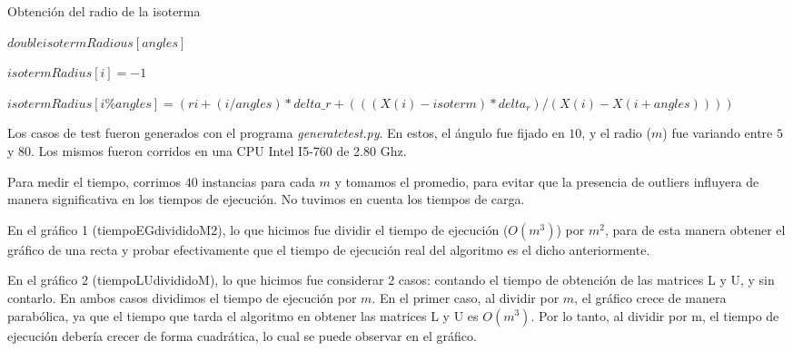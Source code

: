 \documentclass[a4paper]{article}
\begin{document}
\begin{algorithm}
\caption{Obtención del radio de la isoterma}\label{euclid}
\begin{algorithmic}[1]



    \State $double isotermRadious[angles]$

      \State $isotermRadius[i] = -1$
    \EndFor

       \State $isotermRadius[i \% angles] = (ri + (i / angles)*delta\_r + (((X(i) - isoterm) * delta_r)/ (X(i) - X(i+angles)) ))$
      \EndIf
    \EndFor

  \EndFunction

\end{algorithmic}
\end{algorithm}

\newpage




Los casos de test fueron generados con el programa \textit{generatetest.py}. En estos, el ángulo fue fijado en $10$, y el radio ($m$) fue variando entre $5$ y $80$. Los mismos fueron corridos en una CPU Intel I5-760 de 2.80 Ghz.

Para medir el tiempo, corrimos $40$ instancias para cada $m$ y tomamos el promedio, para evitar que la presencia de outliers influyera de manera significativa en los tiempos de ejecución. No tuvimos en cuenta los tiempos de carga.

En el gráfico 1 (tiempoEGdivididoM2), lo que hicimos fue dividir el tiempo de ejecución ($O(m^{3})$) por $m^{2}$, para de esta manera obtener el gráfico de una recta y probar efectivamente que el tiempo de ejecución real del algoritmo es el dicho anteriormente.

En el gráfico 2 (tiempoLUdivididoM), lo que hicimos fue considerar 2 casos: contando el tiempo de obtención de las matrices L y U, y sin contarlo. En ambos casos dividimos el tiempo de ejecución por $m$. En el primer caso, al dividir por $m$, el gráfico crece de manera parabólica, ya que el tiempo que tarda el algoritmo en obtener las matrices L y U es $O(m^{3})$. Por lo tanto, al dividir por m, el tiempo de ejecución debería crecer de forma cuadrática, lo cual se puede observar en el gráfico. 
\end{document}
